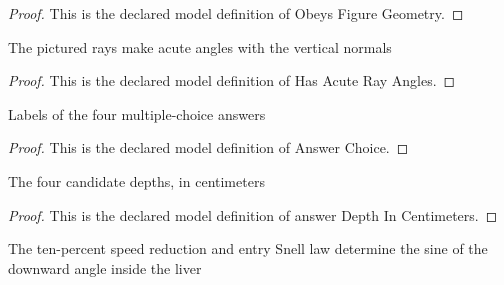 \begin{proof}
  This is the declared model definition of Obeys Figure Geometry.
\end{proof}
\begin{definition}
  \label{def:physics:phyx-mini-0004:phyxminiproblems-phyxmini0004-hasacuterayangles}
  The pictured rays make acute angles with the vertical normals
\end{definition}
\begin{proof}
  This is the declared model definition of Has Acute Ray Angles.
\end{proof}
\begin{definition}
  \label{def:physics:phyx-mini-0004:phyxminiproblems-phyxmini0004-answerchoice}
  Labels of the four multiple-choice answers
\end{definition}
\begin{proof}
  This is the declared model definition of Answer Choice.
\end{proof}
\begin{definition}
  \label{def:physics:phyx-mini-0004:phyxminiproblems-phyxmini0004-answerdepthincentimeters}
  The four candidate depths, in centimeters
\end{definition}
\begin{proof}
  This is the declared model definition of answer Depth In Centimeters.
\end{proof}
\begin{theorem}
  \label{thm:physics:phyx-mini-0004:phyxminiproblems-phyxmini0004-liverdownwardsin-eq-ninetenthsincidentsin}
  The ten-percent speed reduction and entry Snell law determine the sine of the downward angle inside the liver
\end{theorem}
